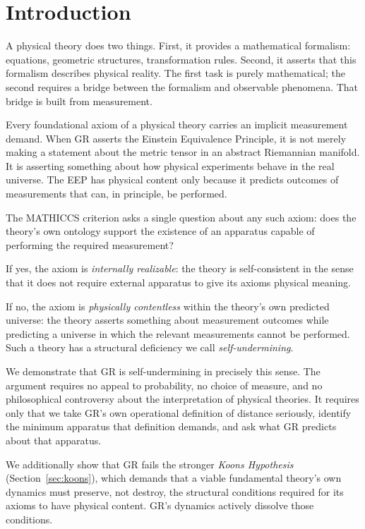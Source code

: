 \documentclass[11pt,a4paper]{article}
\begin{document}
\tableofcontents
\newpage

\section{Introduction}

A physical theory does two things. First, it provides a mathematical formalism:
equations, geometric structures, transformation rules. Second, it asserts that this
formalism describes physical reality. The first task is purely mathematical; the second
requires a bridge between the formalism and observable phenomena. That bridge is
built from measurement.

Every foundational axiom of a physical theory carries an implicit measurement demand.
When GR asserts the Einstein Equivalence Principle, it is not merely making a statement
about the metric tensor in an abstract Riemannian manifold. It is asserting something
about how physical experiments behave in the real universe. The EEP has physical
content only because it predicts outcomes of measurements that can, in principle, be
performed.

The MATHICCS criterion asks a single question about any such axiom: does the theory's
own ontology support the existence of an apparatus capable of performing the required
measurement?

If yes, the axiom is \emph{internally realizable}: the theory is self-consistent in
the sense that it does not require external apparatus to give its axioms physical
meaning.

If no, the axiom is \emph{physically contentless} within the theory's own predicted
universe: the theory asserts something about measurement outcomes while predicting a
universe in which the relevant measurements cannot be performed. Such a theory has
a structural deficiency we call \emph{self-undermining}.

We demonstrate that GR is self-undermining in precisely this sense. The argument
requires no appeal to probability, no choice of measure, and no philosophical
controversy about the interpretation of physical theories. It requires only that we
take GR's own operational definition of distance seriously, identify the minimum
apparatus that definition demands, and ask what GR predicts about that apparatus.

We additionally show that GR fails the stronger \emph{Koons Hypothesis}
(Section~\ref{sec:koons}), which demands that a viable fundamental theory's own
dynamics must preserve, not destroy, the structural conditions required for its axioms
to have physical content. GR's dynamics actively dissolve those conditions.
\end{document}
